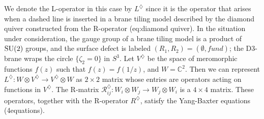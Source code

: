 We denote the L-operator in this case by $L^{\diamondsuit}$ since
it is the operator that arises when a dashed line is inserted in a
brane tiling model described by the diamond quiver constructed from
the R-operator (eq:diamond quiver). In the situation under consideration,
the gauge group of a brane tiling model is a product of $\mathrm{SU}(2)$ groups,
and the surface defect is labeled $\left( R_{1},R_{2} \right)=\left( \emptyset,fund \right)$;
the D3-brane wraps the circle $\{\zeta_{2}=0\}$ in $S^{3}$. Let
$V^{\diamondsuit}$ be the space of meromorphic functions $f(z)$
such that $f(z)=f(1/z)$, and $W=\mathbb{C}^{2}$. Then we can represent
$L^{\diamondsuit}:W\otimes V^{\diamondsuit}\rightarrow V^{\diamondsuit}\otimes W$
as $2\times2$ matrix whose entries are operators acting on functions
in $V^{\diamondsuit}$. The R-matrix $\mathcal{R}_{ij}^{\diamondsuit}:W_{i}\otimes W_{j}\rightarrow W_{j}\otimes W_{i}$
is a $4\times4$ matrix. These operators, together with the R-operator
$R^{\diamondsuit}$, satisfy the Yang-Baxter equations (4equations). 

